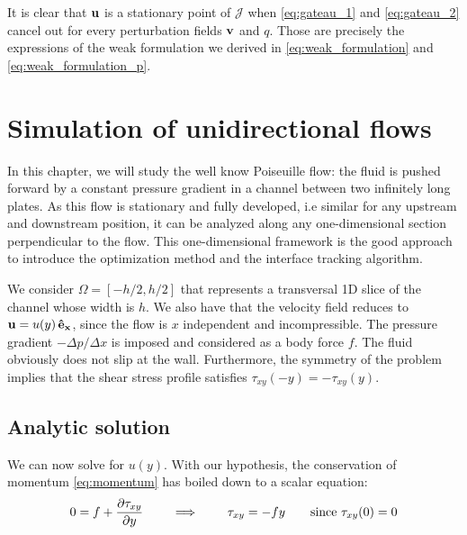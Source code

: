 \documentclass[11 pt]{report}
\begin{document}
It is clear that $\mathbf{u}$ is a stationary point of $\mathcal{J}$ when \eqref{eq:gateau_1} and \eqref{eq:gateau_2} cancel out for every perturbation fields $\mathbf{v}$ and $q$. Those are precisely the expressions of the weak formulation we derived in \eqref{eq:weak_formulation} and \eqref{eq:weak_formulation_p}.


\chapter{Simulation of unidirectional flows}
\label{chap:chap1D}

In this chapter, we will study the well know Poiseuille flow: the fluid is pushed forward by a constant pressure gradient in a channel between two infinitely long plates. As this flow is stationary and fully developed, i.e similar for any upstream and downstream position, it can be analyzed along any one-dimensional section perpendicular to the flow. This one-dimensional framework is the good approach to introduce the optimization method and the interface tracking algorithm.

We consider $\Omega = [-h/2, h/2]$ that represents a transversal 1D slice of the channel whose width is $h$. We also have that the velocity field reduces to $\mathbf{u} = u(y)\,\mathbf{\hat{e}_x}$, since the flow is $x$ independent and incompressible. The pressure gradient $-\Delta p/\Delta x$ is imposed and considered as a body force $f$. The fluid obviously does not slip at the wall. Furthermore, the symmetry of the problem implies that the shear stress profile satisfies $\tau_{xy}(-y) = -\tau_{xy}(y)$.


\section{Analytic solution}
\label{sec:analytic1D}
We can now solve for $u(y)$. With our hypothesis, the conservation of momentum \eqref{eq:momentum} has boiled down to a scalar equation:
\begin{align}
    0 = f + \pdv{\tau_{xy}}{y} \qquad \implies \qquad \tau_{xy} = -f y \qquad \text{since } \tau_{xy}(0)=0
    \label{eq:tau_xy}
\end{align}
\end{document}
